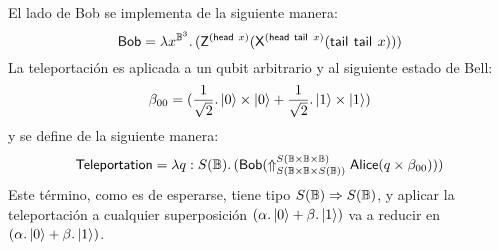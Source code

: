 El lado de Bob se implementa de la siguiente manera:
\[
	\mathsf{Bob} = \lambda x^{\mathbb{B}^3}\ldotp(\mathsf{Z}^{(\mathsf{head}~x)} (\mathsf{X}^{(\mathsf{head}~\mathsf{tail}^{}~x)} (\mathsf{tail}^{}~\mathsf{tail}^{}~x)) )
\]
La teleportación es aplicada a un qubit arbitrario y al siguiente estado de Bell:
\[
	\beta_{00} = ( \frac{1}{\sqrt{2}} . \ket{0} \times \ket{0} + \frac{1}{\sqrt{2}} . \ket{1} \times \ket{1} )
\]
y se define de la siguiente manera:
\[
	\mathsf{Teleportation} = \lambda q : S(\mathbb{B})\ldotp( \mathsf{Bob} ( \Uparrow_{S(\mathbb{B} \times \mathbb{B} \times S(\mathbb{B}))}^{S(\mathbb{B} \times \mathbb{B} \times \mathbb{B})} \mathsf{Alice} (q \times \beta_{00})) )
\]
Este término, como es de esperarse, tiene tipo \( S(\mathbb{B}) \Rightarrow S(\mathbb{B}) \), y aplicar la teleportación a cualquier superposición \( (\alpha . \ket{0} + \beta . \ket{1}) \) va a reducir en \( (\alpha . \ket{0} + \beta . \ket{1}) \).
